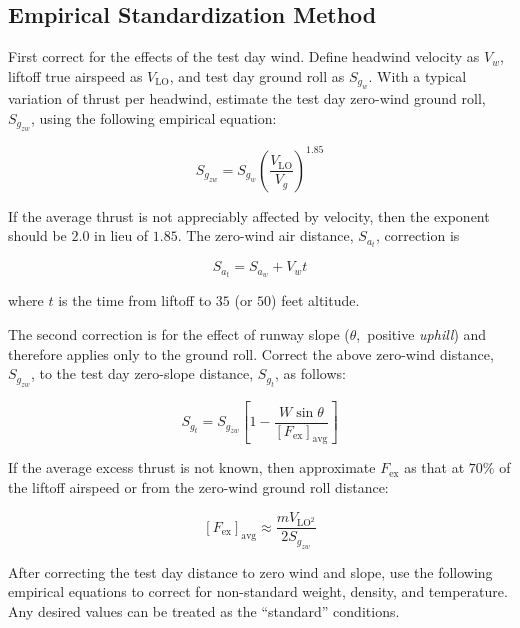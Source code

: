 \documentclass[
]{book}
\begin{document}
\hypertarget{empirical-standardization-method}{%
\subsection{Empirical Standardization Method}\label{empirical-standardization-method}}

First correct for the effects of the test day wind.
Define headwind velocity as \(V_w\), liftoff true airspeed as \(V_{\mathrm{LO}}\), and test day ground roll as \(S_{g_w}\).
With a typical variation of thrust per headwind, estimate the test day zero-wind ground roll, \(S_{g_{zw}}\), using the following empirical equation:

\[
S_{g_{zw}} = S_{g_w} \left( \frac{V_{\mathrm{LO}}}{V_g} \right)^{1.85}
\label{eq:zero-wind-gnd-dist}
\]

If the average thrust is not appreciably affected by velocity, then the exponent should be \(2.0\) in lieu of \(1.85\). The zero-wind air distance, \(S_{a_t}\), correction is

\[
S_{a_t} = S_{a_w} + V_w t
\label{eq:zero-wind-air-dist}
\]

where \(t\) is the time from liftoff to \(35\) (or \(50\)) feet altitude.

The second correction is for the effect of runway slope (\(\theta\),~positive \emph{uphill}) and therefore applies only to the ground roll.
Correct the above zero-wind distance, \(S_{g_{zw}}\), to the test day zero-slope distance, \(S_{g_t}\), as follows:

\[
S_{g_t} = S_{g_{zw}} \left[ 1 - \frac{W \sin \theta}{\left[ F_{\text{ex}} \right]_{\text{avg}}} \right]
\label{eq:zero-slope-air-dist}
\]

If the average excess thrust is not known, then approximate \(F_{\text{ex}}\) as that at \(70\%\) of the liftoff airspeed or from the zero-wind ground roll distance:

\[
\left[ F_{\text{ex}} \right]_{\text{avg}} \approx \frac{m V_{\mathrm{LO}^2}}{2 S_{g_{zw}}}
\label{eq:approx-fex-lo}
\]

After correcting the test day distance to zero wind and slope, use the following empirical equations to correct for non-standard weight, density, and temperature.
Any desired values can be treated as the ``standard'' conditions.
\end{document}
